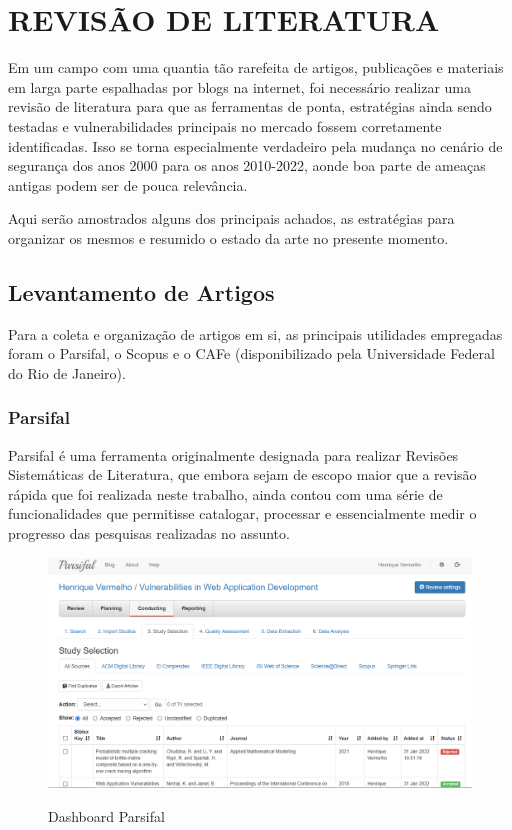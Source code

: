 \chapter{REVISÃO DE LITERATURA}
\label{chp:capitulo2}
Em um campo com uma quantia tão rarefeita de artigos, publicações e materiais em larga parte espalhadas por blogs na internet, foi necessário realizar uma revisão de literatura para que as ferramentas de ponta, estratégias ainda sendo testadas e vulnerabilidades principais no mercado fossem corretamente identificadas. Isso se torna especialmente verdadeiro pela mudança no cenário de segurança dos anos 2000 para os anos 2010-2022, aonde boa parte de ameaças antigas podem ser de pouca relevância.

Aqui serão amostrados alguns dos principais achados, as estratégias para organizar os mesmos e resumido o estado da arte no presente momento.

\section{Levantamento de Artigos}

Para a coleta e organização de artigos em si, as principais utilidades empregadas foram o Parsifal, o Scopus e o CAFe (disponibilizado pela Universidade Federal do Rio de Janeiro). 

\subsection{Parsifal}
Parsifal é uma ferramenta originalmente designada para realizar Revisões Sistemáticas de Literatura, que embora sejam de escopo maior que a revisão rápida que foi realizada neste trabalho, ainda contou com uma série de funcionalidades que permitisse catalogar, processar e essencialmente medir o progresso das pesquisas realizadas no assunto.

\begin{figure}[ht]
    \centering
    \caption{Dashboard Parsifal}
    \includegraphics[width=14cm]{figuras/parsifal.png} 
    \label{fig:internet} 
\end{figure}

